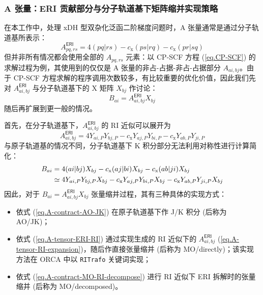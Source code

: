 \subsubsection{A 张量：ERI 贡献部分与分子轨道基下矩阵缩并实现策略}

在本工作中，处理 xDH 型双杂化泛函二阶梯度问题时，A 张量通常是通过分子轨道基所表示：
\begin{equation}
  \label{eq.A-tensor-RI-expansion}
  A_{pq, rs}^\textsf{ERI} = 4 (pq | rs) - c_\mathrm{x} (ps | rq) - c_\mathrm{x} (pr | sq)
\end{equation}
但并非所有情况都会使用全部的 $A_{pq, rs}$ 元素：以 CP-SCF 方程 (\ref{eq.CP-SCF}) 的求解过程为例，其使用到的仅仅是 A 张量的非占-占据-非占-占据部分 $A_{ai, bj}$。由于 CP-SCF 方程求解的程序调用次数较多，有比较重要的优化价值，因此我们先对 $A_{ai, bj}^\textsf{ERI}$ 与分子轨道基下的 X 矩阵 $X_{bj}$ 作讨论：
\begin{equation}
  \label{eq.A-contract-MO-directly}
  B_{ai} = A_{ai, bj}^\textsf{ERI} X_{bj}
\end{equation}
随后再扩展到更一般的情况。

首先，在分子轨道基下，$A_{ai, bj}^\textsf{ERI}$ 的 RI 近似可以展开为
\begin{equation}
  \label{eq.A-tensor-ERI-RI}
  A_{ai, bj}^\textsf{ERI} = 4 Y_{ai, P} Y_{bj, P} - c_\mathrm{x} Y_{aj, P} Y_{bi, P} - c_\mathrm{x} Y_{ab, P} Y_{ji, P}
\end{equation}
与原子轨道基的情况不同，分子轨道基下 K 积分部分无法利用对称性进行计算简化：
\begin{align}
  \label{eq.A-contract-MO-RI-decompose}
  B_{ai} &= 4 (ai | bj) X_{bj} - c_\mathrm{x} (aj | bi) X_{bj} - c_\mathrm{x} (ab | ji) X_{bj} \notag\\
  &\simeq 4 Y_{ai, P} Y_{bj, P} X_{bj} - c_\mathrm{x} Y_{aj, P} Y_{bi, P} X_{bj} - c_\mathrm{x} Y_{ab, P} Y_{ji, P} X_{bj}
\end{align}
因此，对于 $B_{ai} = A_{ai, bj}^\textsf{ERI} X_{bj}$ 张量缩并过程，其有三种具体的实现方式：
\begin{itemize}[nosep]
  \item 依式 (\ref{eq.A-contract-AO-JK}) 在原子轨道基下作 J/K 积分 (后称为 AO/JK)；
  \item 依式 (\ref{eq.A-tensor-ERI-RI}) 通过实现生成的 RI 近似下的 $A_{ai, bj}^\textsf{ERI}$ (\ref{eq.A-tensor-RI-expansion})，随后作直接张量缩并 (后称为 MO/directly)；该实现方法在 ORCA 中以 \verb|RITrafo| 关键词实现；
  \item 依式 (\ref{eq.A-contract-MO-RI-decompose}) 进行 RI 近似下 ERI 拆解时的张量缩并 (后称为 MO/decomposed)。
\end{itemize}



